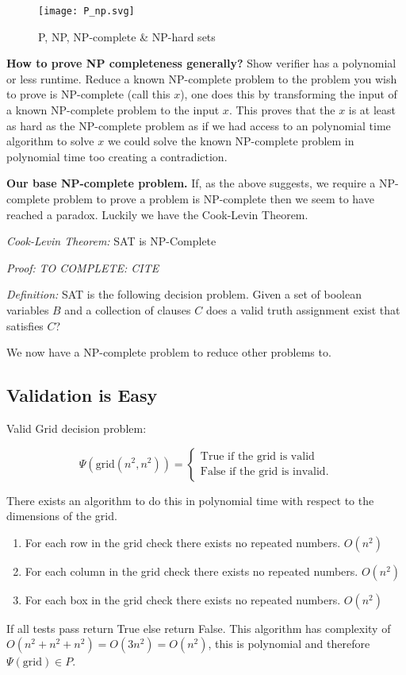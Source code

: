 \documentclass[a4paper,12pt]{article}
\begin{document}
\begin{figure}[h!]
	\begin{center}
		\texttt{[image: P\_np.svg]}
	\end{center}
	\caption{P, NP, NP-complete \& NP-hard sets \cite{P_NP_Figure}}
\end{figure}

		\textbf{How to prove NP completeness generally?}
		Show verifier has a polynomial or less runtime.
		Reduce a known NP-complete problem to the problem you wish to prove is NP-complete (call this $x$), one does this by transforming the input of a known NP-complete problem to the input $x$. This proves that the $x$ is at least as hard as the NP-complete problem as if we had access to an polynomial time algorithm to solve $x$ we could solve the known NP-complete problem in polynomial time too creating a contradiction.

\textbf{Our base NP-complete problem.} If, as the above suggests, we require a NP-complete problem to prove a problem is NP-complete then we seem to have reached a paradox. Luckily we have the Cook-Levin Theorem.

\textit{Cook-Levin Theorem:} SAT is NP-Complete
	
\textit{Proof:}	 \textit{TO COMPLETE: CITE }

\textit{Definition: } SAT is the following decision problem. Given a set of boolean variables $B$ and a collection of clauses $C$ does a valid truth assignment exist that satisfies $C$?

We now have a NP-complete problem to reduce other problems to.

	\subsection{Validation is Easy}
Valid Grid decision problem:

		\begin{equation}
			\Psi(\text{grid}(n^2,n^2)) = \begin{cases}	
							     \text{True if the grid is valid} \\
							     \text{False if the grid is invalid}.
							     \end{cases}
		\end{equation}

There exists an algorithm to do this in polynomial time with respect to the dimensions of the grid. 
\begin{enumerate}
\item For each row in the grid check there exists no repeated numbers. $O(n^2)$
\item For each column in the grid check there exists no repeated numbers. $O(n^2)$
\item For each box in the grid check there exists no repeated numbers. $O(n^2)$
\end{enumerate}
If all tests pass return True else return False.
This algorithm has complexity of $O(n^2 + n^2 + n^2) = O(3n^2) = O(n^2)$, this is polynomial and therefore $\Psi(\text{grid}) \in P$.
\end{document}
